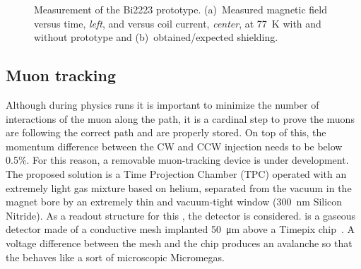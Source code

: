 \begin{refsection}
        \begin{figure}
            \centering
            \hfill
            \caption[muEDM: injection channels Bi2223 tests]{Measurement of the Bi2223 prototype. (a)~Measured magnetic field versus time, {\it left}, and versus coil current, {\it center}, at \SI{77}{K} with and without prototype and (b)~obtained/expected shielding.}
        \label{fig:Bi2223}
        \end{figure}

    \subsection{Muon tracking}
    \label{sec:muEDM:gridpix:beamtime}
        Although during physics runs it is important to minimize the number of interactions of the muon along the path, it is a cardinal step to prove the muons are following the correct path and are properly stored.
        On top of this, the momentum difference between the CW and CCW injection needs to be below 0.5\%.
        For this reason, a removable muon-tracking device is under development.
        The proposed solution is a Time Projection Chamber (TPC) operated with an extremely light gas mixture based on helium, separated from the vacuum in the magnet bore by an extremely thin and vacuum-tight window (\SI{300}{\nano\meter} Silicon Nitride). 
        As a readout structure for this \tpc, the \grid detector is considered. 
        \grid is a gaseous detector made of a conductive mesh implanted \SI{50}{\micro\meter} above a Timepix chip~\cite{Llopart2007NIMA}.
        A voltage difference between the mesh and the chip produces an avalanche so that the \grid behaves like a sort of microscopic Micromegas.


\end{refsection}
